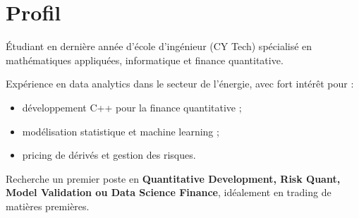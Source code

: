 \section*{Profil}
Étudiant en dernière année d'école d'ingénieur (CY Tech) spécialisé en mathématiques appliquées, informatique et finance quantitative.

Expérience en data analytics dans le secteur de l'énergie, avec fort intérêt pour :
\begin{itemize}
    \item développement C++ pour la finance quantitative ;
    \item modélisation statistique et machine learning ;
    \item pricing de dérivés et gestion des risques.
\end{itemize}

Recherche un premier poste en \textbf{Quantitative Development, Risk Quant, Model Validation ou Data Science Finance}, idéalement en trading de matières premières.
